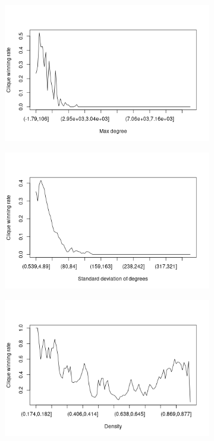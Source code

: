 \documentclass{l4proj}
\theoremstyle{definition}
\theoremstyle{remark}
\begin{document}
\begin{figure}
\begin{subfigure}[t]{0.49\textwidth}
  \end{subfigure}
  \begin{subfigure}[t]{0.49\textwidth}
    \centering
    \includegraphics[width=\textwidth]{images/maxdeg_bins.png}
  \end{subfigure}
  \begin{subfigure}[t]{0.49\textwidth}
    \centering
    \includegraphics[width=\textwidth]{images/stddeg_bins.png}
  \end{subfigure}
  \begin{subfigure}[t]{0.49\textwidth}
    \centering
    \includegraphics[width=\textwidth]{images/density_bins.png}

\end{subfigure}
\end{figure}
\end{document}
